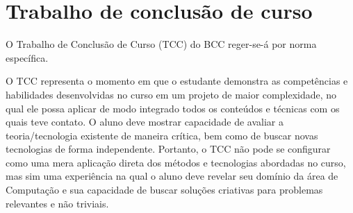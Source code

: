 \section{Trabalho de conclusão de curso}
\label{sec:trabalho_conclusao_curso}


O Trabalho de Conclusão de Curso (TCC) do BCC reger-se-á por norma específica.

O TCC representa o momento em que o estudante demonstra as competências e
habilidades desenvolvidas no curso em um projeto de maior complexidade, no qual
ele possa aplicar de modo integrado todos os conteúdos e técnicas com os quais
teve contato.
O aluno deve mostrar capacidade de avaliar a teoria/tecnologia existente de maneira
crítica, bem como de buscar novas tecnologias de forma independente.
Portanto, o TCC não pode se configurar como uma mera aplicação direta dos
métodos e tecnologias abordadas no curso, mas sim uma experiência na qual o
aluno deve revelar seu domínio da área de Computação e sua capacidade de buscar
soluções criativas para problemas relevantes e não triviais.
